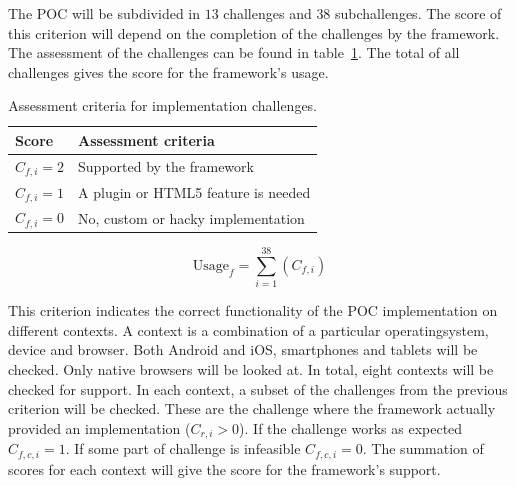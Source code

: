 \documentclass[a4paper]{artikel3}
\newcommand{\setspace}[0]{\vspace{2mm}}
\renewcommand{\paragraph}[1]{\setspace \noindent {\bf #1}  }
\begin{document}

\paragraph{Usage}
The POC will be subdivided in $13$ challenges and $38$ subchallenges.  
The score of this criterion will depend on the completion of the challenges by the framework.  
The assessment of the challenges can be found in table~\ref{table:challenges-scores}.  
The total of all challenges gives the score for the framework's usage.

\begin{table}[h]	
\centering
\begin{tabular}{ll}
\toprule
\textbf{Score} & \textbf{Assessment criteria}\\
\midrule
$C_{f,i} = 2$ & Supported by the framework\\
$C_{f,i} = 1$ & A plugin or HTML5 feature is needed\\
$C_{f,i} = 0$ & No, custom or hacky implementation\\
\bottomrule
\end{tabular}
\caption{Assessment criteria for implementation challenges.}
\label{table:challenges-scores}
\end{table}

\begin{equation}
  \text{Usage}_f = \sum_{i=1}^{38}{\left(C_{f,i}\right)}
  \label{eq:gebruik}
\end{equation}

\paragraph{Support}
This criterion indicates the correct functionality of the POC implementation on different contexts.
A context is a combination of a particular operatingsystem, device and browser.
Both Android and iOS, smartphones and tablets will be checked.
Only native browsers will be looked at.
In total, eight contexts will be checked for support.
In each context,  a subset of the challenges from the previous criterion will be checked.  
These are the challenge where the framework actually provided an implementation ($C_{r,i} > 0$).
If the challenge works as expected $C_{f,c,i} = 1$.
If some part of challenge is infeasible $C_{f,c,i} = 0$.
The summation of scores for each context will give the score for the framework's support.
\end{document}
